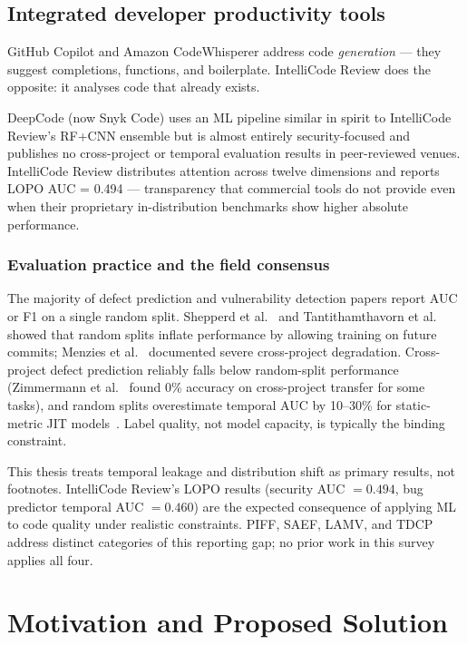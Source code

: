 \documentclass[12pt, oneside]{report}
\begin{document}
\section{Integrated developer productivity tools}
\label{sec:rel-idt}

GitHub Copilot and Amazon CodeWhisperer address code \textit{generation} — they suggest
completions, functions, and boilerplate. IntelliCode Review does the opposite: it analyses
code that already exists.

DeepCode (now Snyk Code) uses an ML pipeline similar in spirit to IntelliCode Review's RF+CNN ensemble but is almost entirely security-focused and publishes no cross-project or temporal evaluation results in peer-reviewed venues. IntelliCode Review distributes attention across twelve dimensions and reports LOPO AUC = 0.494 — transparency that commercial tools do not provide even when their proprietary in-distribution benchmarks show higher absolute performance.

\subsection*{Evaluation practice and the field consensus}

The majority of defect prediction and vulnerability detection papers report AUC or F1 on a single random split. Shepperd et al.~\cite{shepperd2014} and Tantithamthavorn et al.~\cite{tantithamthavorn2016} showed that random splits inflate performance by allowing training on future commits; Menzies et al.~\cite{menzies2011} documented severe cross-project degradation. Cross-project defect prediction reliably falls below random-split performance (Zimmermann et al.~\cite{zimmermann2007} found 0\% accuracy on cross-project transfer for some tasks), and random splits overestimate temporal AUC by 10--30\% for static-metric JIT models~\cite{kamei2013}. Label quality, not model capacity, is typically the binding constraint.

This thesis treats temporal leakage and distribution shift as primary results, not footnotes. IntelliCode Review's LOPO results (security AUC $= 0.494$, bug predictor temporal AUC $= 0.460$) are the expected consequence of applying ML to code quality under realistic constraints. PIFF, SAEF, LAMV, and TDCP address distinct categories of this reporting gap; no prior work in this survey applies all four.

\chapter{Motivation and Proposed Solution}
\label{ch:motivation}
\end{document}
